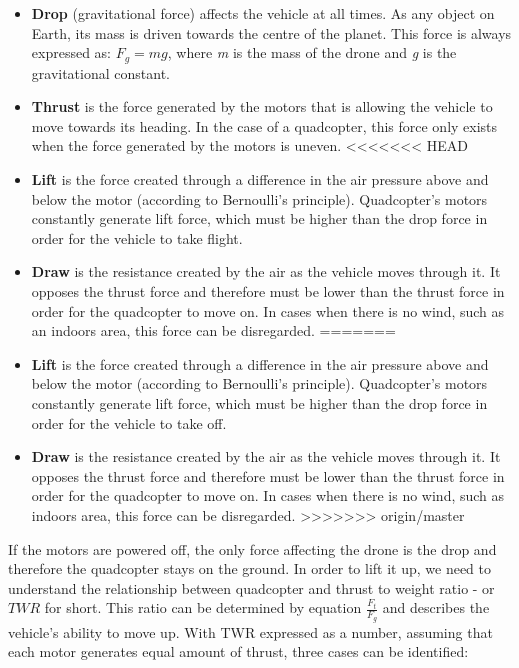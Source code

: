 \begin{itemize}
  \item \textbf{Drop} (gravitational force) affects the vehicle at all times. As any object on Earth, its mass is driven towards the centre of the planet. This force is always expressed as: $F_g = mg$, where \textit{m} is the mass of the drone and \textit{g} is the gravitational constant.
  \item \textbf{Thrust} is the force generated by the motors that is allowing the vehicle to move towards its heading. In the case of a quadcopter, this force only exists when the force generated by the motors is uneven.
<<<<<<< HEAD
  \item \textbf{Lift} is the force created through a difference in the air pressure above and below the motor (according to Bernoulli's principle). Quadcopter's motors constantly generate lift force, which must be higher than the drop force in order for the vehicle to take flight.
  \item \textbf{Draw} is the resistance created by the air as the vehicle moves through it. It opposes the thrust force and therefore must be lower than the thrust force in order for the quadcopter to move on. In cases when there is no wind, such as an indoors area, this force can be disregarded.
=======
  \item \textbf{Lift} is the force created through a difference in the air pressure above and below the motor (according to Bernoulli's principle). Quadcopter's motors constantly generate lift force, which must be higher than the drop force in order for the vehicle to take off.
  \item \textbf{Draw} is the resistance created by the air as the vehicle moves through it. It opposes the thrust force and therefore must be lower than the thrust force in order for the quadcopter to move on. In cases when there is no wind, such as indoors area, this force can be disregarded.
>>>>>>> origin/master
\end{itemize} 

If the motors are powered off, the only force affecting the drone is the drop and therefore the quadcopter stays on the ground. In order to lift it up, we need to understand the relationship between quadcopter and thrust to weight ratio - or $TWR$ for short. This ratio can be determined by equation $\frac{F_t}{F_g}$ and describes the vehicle's ability to move up. With TWR expressed as a number, assuming that each motor generates equal amount of thrust, three cases can be identified:

